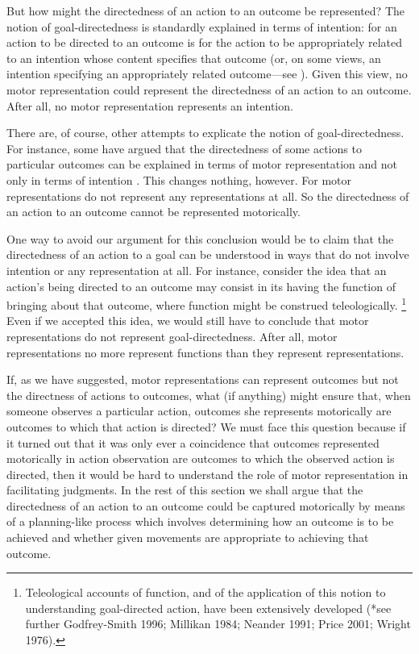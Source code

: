 \documentclass[12pt,\papersize]{extarticle}
\begin{document}
But how might the directedness of an action to an outcome be represented? The notion of goal-directedness is standardly explained in terms of intention: for an action to be directed to an outcome is for the action to be appropriately related to an intention whose content specifies that outcome (or, on some views, an intention specifying an appropriately related outcome---see \citealp{Bratman:1984jr}). Given this view, no motor representation could represent the directedness of an action to an outcome.  After all, no motor representation represents an intention.  

There are, of course, other attempts to explicate the notion of goal-directedness.  For instance, some have argued that the directedness of some actions to particular outcomes can be explained in terms of motor representation and not only in terms of intention \citep{butterfill:2012_intention}.  This changes nothing, however.  For motor representations do not represent any representations at all.  So the directedness of an action to an outcome cannot be represented motorically.

One way to avoid our argument for this conclusion would be to claim that the directedness of an action to a goal can be understood in ways that do not involve intention or any representation at all.  For instance, consider the idea that an action's being directed to an outcome may consist in its having the function of bringing about that outcome, where function might be construed teleologically.%
\footnote{
Teleological accounts of function, and of the application of this notion to understanding goal-directed action, have been extensively developed (*see further Godfrey-Smith 1996; Millikan 1984; Neander 1991; Price 2001; Wright 1976).
} 
Even if we accepted this idea, we would still have to conclude that motor representations do not represent goal-directedness. After all, motor representations no more represent functions than they represent representations.

If, as we have suggested, motor representations can represent outcomes but not the directness of actions to outcomes, what (if anything) might ensure that, when someone observes a particular action, outcomes she represents motorically are outcomes to which that action is directed? We must face this question because if it turned out that it was only ever a coincidence that outcomes represented motorically in action observation are outcomes to which the observed action is directed, then it would be hard to understand the role of motor representation in facilitating judgments. In the rest of this section we shall argue that the directedness of an action to an outcome could be captured motorically by means of a planning-like process which involves determining how an outcome is to be achieved and whether given movements are appropriate to achieving that outcome.
\end{document}
